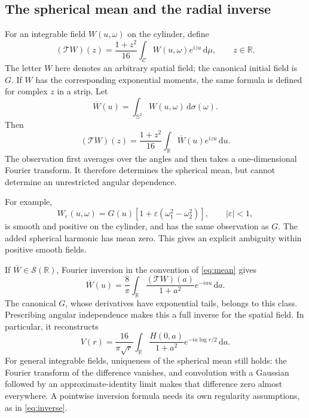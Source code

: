 \documentclass[11pt]{article}
\theoremstyle{remark}
\numberwithin{equation}{section}
\newcommand{\R}{\mathbb R}
\newcommand{\Sph}{\mathbb S^2}
\newcommand{\cC}{\mathcal C}
\newcommand{\dd}{\,\mathrm d}
\newcommand{\Sch}{\mathcal S}
\begin{document}
\subsection{The spherical mean and the radial inverse}

For an integrable field \(W(u,\omega)\) on the cylinder, define
\begin{equation}\label{eq:observation}
 (\mathcal TW)(z)=\frac{1+z^2}{16}
 \int_{\cC}W(u,\omega)e^{izu}\dd\mu,
 \qquad z\in\R.
\end{equation}
The letter \(W\) here denotes an arbitrary spatial field; the canonical
initial field is \(G\). If \(W\) has the corresponding exponential
moments, the same formula is defined for complex \(z\) in a strip.
Let
\[
 \overline W(u)=\int_{\Sph}W(u,\omega)\dd\sigma(\omega).
\]
Then
\begin{equation}\label{eq:mean}
 (\mathcal TW)(z)=\frac{1+z^2}{16}
 \int_{\R}\overline W(u)e^{izu}\dd u.
\end{equation}
The observation first averages over the angles and then takes a
one-dimensional Fourier transform. It therefore determines the spherical
mean, but cannot determine an unrestricted angular dependence.

For example,
\begin{equation}\label{eq:angular}
 W_\varepsilon(u,\omega)
 =G(u)[1+\varepsilon(\omega_1^2-\omega_2^2)],
 \qquad |\varepsilon|<1,
\end{equation}
is smooth and positive on the cylinder, and has the same observation
as \(G\). The added spherical harmonic has mean zero.
This gives an explicit ambiguity within positive smooth fields.

If \(\overline W\in\Sch(\R)\), Fourier inversion in the convention
of \eqref{eq:mean} gives
\begin{equation}\label{eq:inverse}
 \overline W(u)=\frac8\pi\int_{\R}
 \frac{(\mathcal TW)(a)}{1+a^2}e^{-iau}\dd a.
\end{equation}
The canonical \(G\), whose derivatives have exponential tails, belongs
to this class. Prescribing angular independence makes this a full inverse
for the spatial field. In particular, it reconstructs
\begin{equation}\label{eq:inverseV}
 V(r)=\frac{16}{\pi\sqrt r}\int_{\R}
 \frac{H(0,a)}{1+a^2}e^{-ia\log r/2}\dd a.
\end{equation}
For general integrable fields, uniqueness of the spherical mean still
holds: the Fourier transform of the difference vanishes, and convolution
with a Gaussian followed by an approximate-identity limit makes that
difference zero almost everywhere. A pointwise inversion formula needs
its own regularity assumptions, as in \eqref{eq:inverse}.
\end{document}
